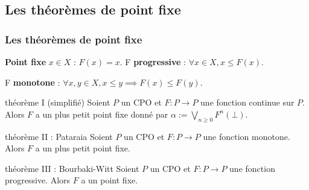 \documentclass{beamer}
\begin{document}
\begin{frame}
\begin{columns}
\begin{column}{0.5\linewidth}

\end{column}
\end{columns}









\end{frame}

\subsection{Les théorèmes de point fixe}
\begin{frame}
\frametitle{Les théorèmes de point fixe}

\textbf{Point fixe} $x \in X$ : $F(x) = x$. F \textbf{progressive} : $\forall x \in X, x \leq F(x)$.

F \textbf{monotone} : $\forall x, y \in X, x \leq y \implies F(x) \leq F(y)$.



\begin{alertblock}{théorème I (simplifié)}
Soient $P$ un CPO et $F : P \rightarrow P$ une fonction continue sur $P$. Alors $F$ a un plus petit point fixe donné par $\alpha := \bigvee_{n \geq 0}F^n(\bot)$.
\end{alertblock}

\pause
\begin{alertblock}{théorème II : Pataraia}
Soient $P$ un CPO et $F : P \rightarrow P$ une fonction monotone. Alors $F$ a un plus petit point fixe.
\end{alertblock} %

\pause
\begin{alertblock}{théorème III : Bourbaki-Witt}
Soient $P$ un CPO et $F : P \rightarrow P$ une fonction progressive. Alors $F$ a un point fixe.

\end{alertblock}



\end{frame}
\end{document}
